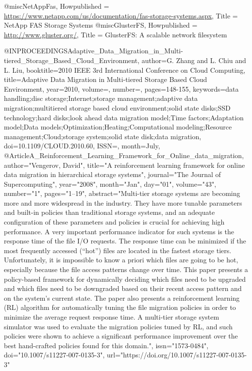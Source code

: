 @misc{NetAppFas,
Howpublished = {\url{https://www.netapp.com/us/documentation/fas-storage-systems.aspx}},
Title = {NetApp FAS Storage Systems}
}
@misc{GlusterFS,
	Howpublished = {\url{http://www.gluster.org/}},
	Title = {GlusterFS: A scalable network filesystem}
  }


@INPROCEEDINGS{Adaptive_Data_Migration_in_Multi-tiered_Storage_Based_Cloud_Environment,
author={G. {Zhang} and L. {Chiu} and L. {Liu}},
booktitle={2010 IEEE 3rd International Conference on Cloud Computing},
title={Adaptive Data Migration in Multi-tiered Storage Based Cloud Environment},
year={2010},
volume={},
number={},
pages={148-155},
keywords={data handling;disc storage;Internet;storage management;adaptive data migration;multitiered storage based cloud environment;solid state disks;SSD technology;hard disks;look ahead data migration model;Time factors;Adaptation model;Data models;Optimization;Heating;Computational modeling;Resource management;Cloud;storage system;solid state disk;data migration},
doi={10.1109/CLOUD.2010.60},
ISSN={},
month={July},}
@Article{A_Reinforcement_Learning_Framework_for_Online_data_migration,
author="Vengerov, David",
title="A reinforcement learning framework for online data migration in hierarchical storage systems",
journal="The Journal of Supercomputing",
year="2008",
month="Jan",
day="01",
volume="43",
number="1",
pages="1--19",
abstract="Multi-tier storage systems are becoming more and more widespread in the industry. They have more tunable parameters and built-in policies than traditional storage systems, and an adequate configuration of these parameters and policies is crucial for achieving high performance. A very important performance indicator for such systems is the response time of the file I/O requests. The response time can be minimized if the most frequently accessed (``hot'') files are located in the fastest storage tiers. Unfortunately, it is impossible to know a priori which files are going to be hot, especially because the file access patterns change over time. This paper presents a policy-based framework for dynamically deciding which files need to be upgraded and which files need to be downgraded based on their recent access pattern and on the system's current state. The paper also presents a reinforcement learning (RL) algorithm for automatically tuning the file migration policies in order to minimize the average request response time. A multi-tier storage system simulator was used to evaluate the migration policies tuned by RL, and such policies were shown to achieve a significant performance improvement over the best hand-crafted policies found for this domain.",
issn="1573-0484",
doi="10.1007/s11227-007-0135-3",
url="https://doi.org/10.1007/s11227-007-0135-3"
}


